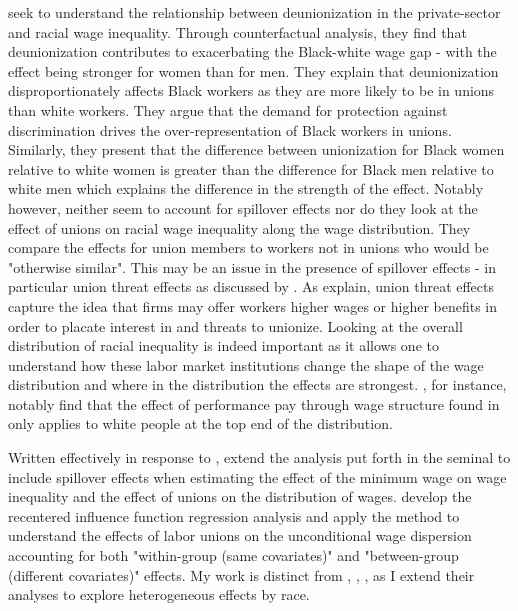 \documentclass[11pt]{article}
\begin{document}
\citet{rosenfeldkleykamp2012} seek to understand the relationship between deunionization in the private-sector and racial wage inequality. Through counterfactual analysis, they find that deunionization contributes to exacerbating the Black-white wage gap - with the effect being stronger for women than for men. They explain that deunionization disproportionately affects Black workers as they are more likely to be in unions than white workers. They argue that the demand for protection against discrimination drives the over-representation of Black workers in unions. Similarly, they present that the difference between unionization for Black women relative to white women is greater than the difference for Black men relative to white men which explains the difference in the strength of the effect. Notably however, \citet{rosenfeldkleykamp2012} neither seem to account for spillover effects nor do they look at the effect of unions on racial wage inequality along the wage distribution. They compare the effects for union members to workers not in unions who would be "otherwise similar". This may be an issue in the presence of spillover effects - in particular union threat effects as discussed by \citet{fll2021}. As \citet{fll2021} explain, union threat effects capture the idea that firms may offer workers higher wages or higher benefits in order to placate interest in and threats to unionize. Looking at the overall distribution of racial inequality is indeed important as it allows one to understand how these labor market institutions change the shape of the wage distribution and where in the distribution the effects are strongest. \citet{heywoodparent2012}, for instance, notably find that the effect of performance pay through wage structure found in \citet{lmp2009} only applies to white people at the top end of the distribution.

Written effectively in response to \citet{ams2016}, \citet{fll2021} extend the analysis put forth in the seminal \citet{dfl1996} to include spillover effects when estimating the effect of the minimum wage on wage inequality and the effect of unions on the distribution of wages. \citet{ffl2009} develop the recentered influence function regression analysis and apply the method to understand the effects of labor unions on the unconditional wage dispersion accounting for both "within-group (same covariates)" and "between-group (different covariates)" effects. My work is distinct from \citet{fll2021}, \citet{ams2016}, \citet{ffl2009}, \citet{dfl1996} as I extend their analyses to explore heterogeneous effects by race. 
\end{document}
